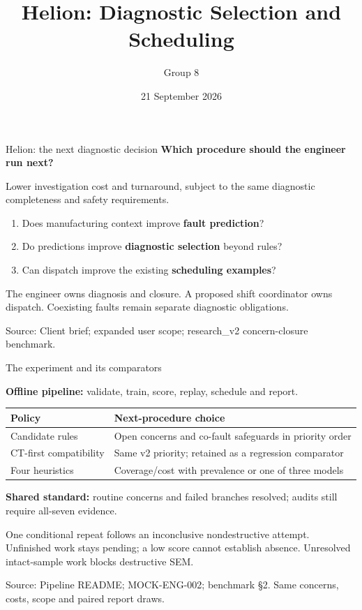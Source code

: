 \documentclass[aspectratio=169,11pt]{beamer}
\title{Helion: Diagnostic Selection and Scheduling}
\author{Group 8}
\date{21 September 2026}
\newcommand{\lead}[1]{{\large\bfseries #1}\par\medskip}
\newcommand{\source}[1]{\vfill{\fontsize{6.6}{8}\selectfont\color{Muted}Source: #1\par}}
\newcommand{\smalltext}[1]{{\fontsize{9}{11.4}\selectfont #1\par}}
\begin{document}
\begin{frame}[t]{Helion: the next diagnostic decision}
  \lead{Which procedure should the engineer run next?}
  Lower investigation cost and turnaround, subject to the same
  diagnostic completeness and safety requirements.

  \vspace{4mm}
  \begin{enumerate}
    \setlength{\itemsep}{2mm}
    \item Does manufacturing context improve \textbf{fault prediction}?
    \item Do predictions improve \textbf{diagnostic selection} beyond rules?
    \item Can dispatch improve the existing \textbf{scheduling examples}?
  \end{enumerate}
  \vspace{3mm}
  \smalltext{The engineer owns diagnosis and closure. A proposed shift coordinator owns dispatch. Coexisting faults remain separate diagnostic obligations.}
  \source{Client brief; expanded user scope; research\_v2 concern-closure benchmark.}
  \note{\SlideOneNotes}
\end{frame}

\begin{frame}[t]{The experiment and its comparators}
  \smalltext{\textbf{Offline pipeline:} validate, train, score, replay, schedule and report.}
  \vspace{2mm}
  \begin{tabularx}{\textwidth}{@{}p{3.3cm}Y@{}}
    \toprule
    \textbf{Policy} & \textbf{Next-procedure choice} \\
    \midrule
    Candidate rules & Open concerns and co-fault safeguards in priority order \\
    CT-first compatibility & Same v2 priority; retained as a regression comparator \\
    Four heuristics & Coverage/cost with prevalence or one of three models \\
    \bottomrule
  \end{tabularx}\par
  \vspace{3mm}
  \smalltext{\textbf{Shared standard:} routine concerns and failed branches resolved;
  audits still require all-seven evidence.}
  \vspace{1.5mm}
  \smalltext{One conditional repeat follows an inconclusive nondestructive attempt.
  Unfinished work stays pending; a low score cannot establish absence.
  Unresolved intact-sample work blocks destructive SEM.}
  \source{Pipeline README; MOCK-ENG-002; benchmark \S2. Same concerns, costs, scope and paired report draws.}
  \note{\SlideTwoNotes}
\end{frame}
\end{document}
